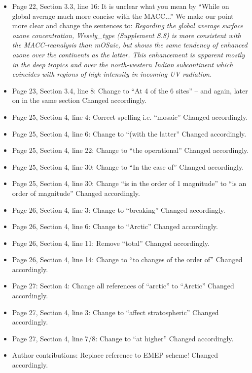 \begin{itemize}
\item {\color{blue}Page 22, Section 3.3, line 16: It is unclear what you mean by “While on global average much more concise with the MACC...”}
  We make our point more clear and change the sentences to: \emph{Regarding the global average surface ozone concentration, \emph{Wesely\_type} (Supplement S.8) is more consistent with the MACC-reanalysis than \emph{mOSaic}, but shows the same tendency of enhanced ozone over the continents as the latter.
This enhancement is apparent mostly in the deep tropics and over the north-western Indian subcontinent which coincides with regions of high intensity in incoming UV radiation.}
\item {\color{blue}Page 23, Section 3.4, line 8: Change to “At 4 of the 6 sites” – and again, later on in the same section}
  Changed accordingly.
\item {\color{blue}Page 25, Section 4, line 4: Correct spelling i.e. “mosaic”}
  Changed accordingly.
\item {\color{blue}Page 25, Section 4, line 6: Change to “(with the latter”}
  Changed accordingly.
\item {\color{blue}Page 25, Section 4, line 22: Change to “the operational”}
  Changed accordingly.
\item {\color{blue}Page 25, Section 4, line 30: Change to “In the case of”}
  Changed accordingly.
\item {\color{blue}Page 25, Section 4, line 30: Change “is in the order of 1 magnitude” to “is an order of magnitude”}
  Changed accordingly.
\item {\color{blue}Page 26, Section 4, line 3: Change to “breaking”}
  Changed accordingly.
\item {\color{blue}Page 26, Section 4, line 6: Change to “Arctic”}
  Changed accordingly.
\item {\color{blue}Page 26, Section 4, line 11: Remove “total”}
  Changed accordingly.
\item {\color{blue}Page 26, Section 4, line 14: Change to “to changes of the order of”}
  Changed accordingly.
\item {\color{blue}Page 27: Section 4: Change all references of “arctic” to “Arctic”}
  Changed accordingly.
\item {\color{blue}Page 27, Section 4, line 3: Change to “affect stratospheric”}
  Changed accordingly.
\item {\color{blue}Page 27, Section 4, line 7/8: Change to “at higher”}
  Changed accordingly.
\item {\color{blue}Author contributions: Replace reference to EMEP scheme!}
  Changed accordingly.
\end{itemize}
\newpage
%
